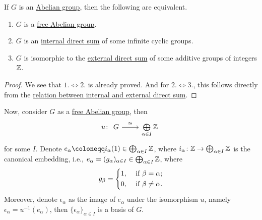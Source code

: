 \begin{proposition}
	If \(G\) is an  \hyperref[def:Abelian-group]{Abelian group}, then the following are equivalent.
	\begin{enumerate}
		\item \(G\) is a \hyperref[def:free-Abelian-group]{free Abelian group}.
		\item \(G\) is an \hyperref[def:internal-direct-sum]{internal direct sum} of some infinite cyclic groups.
		\item \(G\) is isomorphic to the \hyperref[def:external-direct-sum]{external direct sum} of some additive groups of integers \(\mathbb{\MakeUppercase{z}} \).
	\end{enumerate}
\end{proposition}
\begin{proof}
	We see that \(1. \iff 2.\) is already proved. And for \(2. \iff 3.\), this follows directly from the \hyperref[rmk:relation-between-internal-and-externam-direct-sum]{relation between internal and external direct sum}.
\end{proof}

Now, consider \(G\) as a \hyperref[def:free-Abelian-group]{free Abelian group}, then
\[
	u\colon \begin{tikzcd}
		G & {\bigoplus\limits_{\alpha\in I} \mathbb{Z}}
		\arrow["\cong", from=1-1, to=1-2]
	\end{tikzcd}
\]
for some \(I\). Denote \(e_\alpha \coloneqq i_\alpha (1)\in \bigoplus_{\alpha \in I}\mathbb{\MakeUppercase{z}} \), where \(i_\alpha \colon \mathbb{\MakeUppercase{z}} \to \bigoplus_{\alpha \in I}\mathbb{\MakeUppercase{z}} \) is the
canonical embedding, i.e., \(e_\alpha = (g_\alpha )_{\alpha \in I}\in \bigoplus_{\alpha \in I}\mathbb{\MakeUppercase{z}} \), where
\[
	g_\beta = \begin{dcases}
		1, & \text{ if } \beta = \alpha;    \\
		0, & \text{ if } \beta \neq \alpha.
	\end{dcases}
\]
Moreover, denote \(\epsilon _\alpha \) as the image of \(e_\alpha \) under the isomorphism \(u\), namely \(\epsilon _\alpha = u^{-1} (e_\alpha )\), then \(\{\epsilon _\alpha \}_{\alpha \in I}\) is a basis of \(G\).


